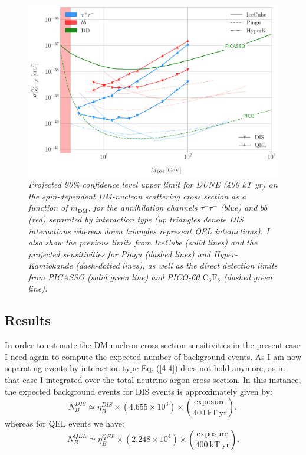 \begin{figure}[t]
	\centering
	\includegraphics[width=0.95\linewidth]{Images/DM_Analysis/solardm_xsection_sd.pdf}
	\caption{\textit{Projected 90\% confidence level upper limit for DUNE (400 kT yr) on the spin-dependent DM-nucleon scattering cross section as a function of $m_{\mathrm{DM}}$, for the annihilation channels $\tau^{+}\tau^{-}$ (blue) and $b\bar{b}$ (red) separated by interaction type (up triangles denote DIS interactions whereas down triangles represent QEL interactions). I also show the previous limits from IceCube \cite{IceCube2021} (solid lines) and the projected sensitivities for Pingu \cite{Chen2014} (dashed lines) and Hyper-Kamiokande \cite{Bell2021} (dash-dotted lines), as well as the direct detection limits from PICASSO \cite{Behnke2016} (solid green line) and PICO-60 $\mathrm{C}_{3}\mathrm{F}_{8}$ \cite{PICO2019} (dashed green line).}}
	\label{fig:solardm_xsection_sd}
\end{figure}

\subsection{Results}

In order to estimate the DM-nucleon cross section sensitivities in the present case I need again to compute the expected number of background events. As I am now separating events by interaction type Eq. (\ref{4.4}) does not hold anymore, as in that case I integrated over the total neutrino-argon cross section. In this instance, the expected background events for DIS events is approximately given by:
\begin{equation}\label{6.11}
	N_{B}^{DIS} \simeq \eta_{B}^{DIS} \times \left(4.655 \times 10^{3}\right) \times \left(\frac{\mathrm{exposure}}{400 \ \mathrm{kT} \ \mathrm{yr}}\right),
\end{equation}
whereas for QEL events we have:
\begin{equation}\label{6.12}
	N_{B}^{QEL} \simeq \eta_{B}^{QEL} \times \left(2.248\times 10^{4}\right) \times \left(\frac{\mathrm{exposure}}{400 \ \mathrm{kT} \ \mathrm{yr}}\right).
\end{equation}

